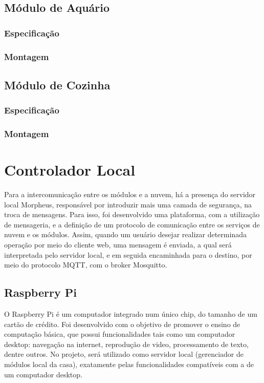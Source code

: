 \subsection{Módulo de Aquário}
\subsubsection{Especificação}
\subsubsection{Montagem}

\subsection{Módulo de Cozinha}
\subsubsection{Especificação}
\subsubsection{Montagem}

\section{Controlador Local}
Para a intercomunicação entre os módulos e a nuvem, há a presença do servidor local Morpheus, responsável por introduzir mais uma camada de segurança, na troca de mensagens. Para isso, foi desenvolvido uma plataforma, com a utilização de mensageria, e a definição de um protocolo de comunicação entre os serviços de nuvem e os módulos. Assim, quando um usuário desejar realizar determinada operação por meio do cliente web, uma mensagem é enviada, a qual será interpretada pelo servidor local, e em seguida encaminhada para o destino, por meio do protocolo MQTT, com o broker Mosquitto.

\subsection{Raspberry Pi}
O Raspberry Pi é um computador integrado num único chip, do tamanho de um cartão de crédito. Foi desenvolvido com o objetivo de promover o ensino de computação básica, que possui funcionalidades tais como um computador desktop: navegação na internet, reprodução de video, processamento de texto, dentre outros. No projeto, será utilizado como servidor local (gerenciador de módulos local da casa), exatamente pelas funcionalidades compatíveis com a de um computador desktop.

